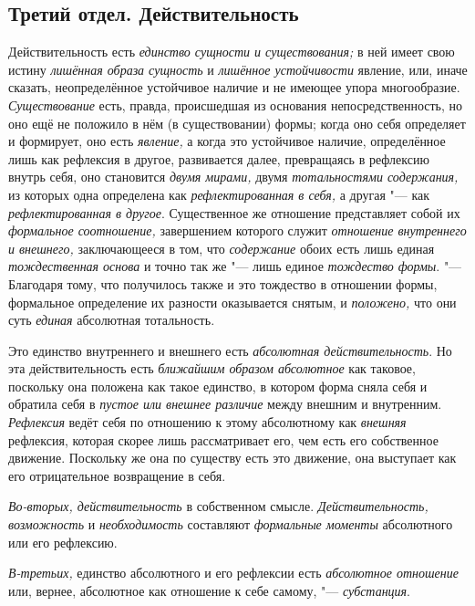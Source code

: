 \subsection[{\em Третий отдел.} ДЕЙСТВИТЕЛЬНОСТЬ]
{Третий отдел. Действительность}

Действительность есть {\em единство сущности и существования;} в ней имеет
свою истину {\em лишённая образа сущность} и
{\em лишённое устойчивости} явление, или, иначе
сказать, неопределённое устойчивое наличие и не имеющее упора многообразие.
{\em Существование} есть, правда, происшедшая из
основания непосредственность, но оно ещё не положило в нём (в
существовании) формы; когда оно себя определяет и формирует, оно есть
{\em явление,} а когда это устойчивое наличие,
определённое лишь как рефлексия в другое, развивается далее, превращаясь в
рефлексию внутрь себя, оно становится {\em двумя
мирами,} двумя {\em тотальностями содержания,} из
которых одна определена как {\em рефлектированная в
себя,} а другая "--- как {\em рефлектированная в другое}.
Существенное же отношение представляет собой их
{\em формальное соотношение,} завершением которого
служит {\em отношение внутреннего и внешнего,}
заключающееся в том, что {\em содержание} обоих есть
лишь единая {\em тождественная основа} и точно так же
"--- лишь единое {\em тождество формы}. "--- Благодаря тому,
что получилось также и это тождество в отношении формы, формальное
определение их разности оказывается снятым, и
{\em положено,} что они суть {\em единая} абсолютная тотальность.

Это единство внутреннего и внешнего есть {\em абсолютная
действительность}. Но эта действительность есть
{\em ближайшим образом абсолютное} как таковое,
поскольку она положена как такое единство, в котором форма сняла себя и
обратила себя в {\em пустое или внешнее различие} между
внешним и внутренним. {\em Рефлексия} ведёт себя по
отношению к этому абсолютному как {\em внешняя}
рефлексия, которая скорее лишь рассматривает его, чем есть его собственное
движение. Поскольку же она по существу есть это движение, она выступает как
его отрицательное возвращение в себя.

{\em Во-вторых, действительность} в собственном смысле.
{\em Действительность, возможность} и {\em необходимость} составляют
{\em формальные моменты} абсолютного или его рефлексию.

{\em В-третьих,} единство абсолютного и его рефлексии
есть {\em абсолютное отношение} или, вернее, абсолютное
как отношение к себе самому, "--- {\em субстанция}.

